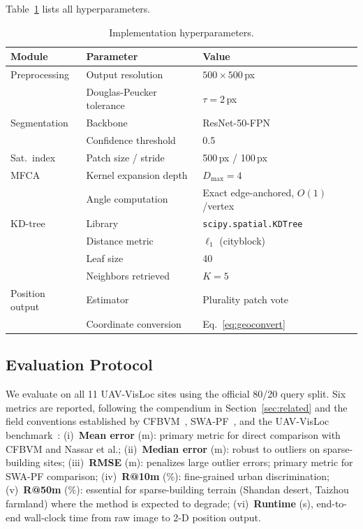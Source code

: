 \documentclass[10pt]{article}
\theoremstyle{plain}
\theoremstyle{definition}
\begin{document}
Table~\ref{tab:impl} lists all hyperparameters.

\begin{table}[htbp]
\caption{Implementation hyperparameters.}
\label{tab:impl}
\centering\small
\setlength{\tabcolsep}{4pt}
\begin{tabular}{lll}
\toprule
\textbf{Module} & \textbf{Parameter} & \textbf{Value} \\
\midrule
Preprocessing   & Output resolution            & $500\!\times\!500$\,px \\
                & Douglas-Peucker tolerance    & $\tau = 2$\,px \\
Segmentation    & Backbone                     & ResNet-50-FPN \\
                & Confidence threshold         & 0.5 \\
Sat.\ index     & Patch size / stride          & 500\,px / 100\,px \\
MFCA            & Kernel expansion depth       & $D_{\max} = 4$ \\
                & Angle computation            & Exact edge-anchored, $O(1)$/vertex \\
KD-tree         & Library                      & \texttt{scipy.spatial.KDTree} \\
                & Distance metric              & $\ell_1$ (cityblock) \\
                & Leaf size                    & 40 \\
                & Neighbors retrieved          & $K = 5$ \\
Position output & Estimator                    & Plurality patch vote \\
                & Coordinate conversion        & Eq.~\eqref{eq:geoconvert} \\
\bottomrule
\end{tabular}
\end{table}

\subsection{Evaluation Protocol}
\label{sec:protocol}

We evaluate on all 11 UAV-VisLoc sites using the official 80/20 query split.
Six metrics are reported, following the compendium in Section~\ref{sec:related}
and the field conventions established by CFBVM~\cite{ouyang2024cfbvm},
SWA-PF~\cite{yuan2025swapf}, and the UAV-VisLoc benchmark~\cite{uavvisloc2024}:
(i)~\textbf{Mean error} (m): primary metric for direct comparison with CFBVM
and Nassar et al.;
(ii)~\textbf{Median error} (m): robust to outliers on sparse-building sites;
(iii)~\textbf{RMSE} (m): penalizes large outlier errors; primary metric for
SWA-PF comparison;
(iv)~\textbf{R@10m} (\%): fine-grained urban discrimination;
(v)~\textbf{R@50m} (\%): essential for sparse-building terrain
(Shandan desert, Taizhou farmland) where the method is expected to degrade;
(vi)~\textbf{Runtime} (s), end-to-end wall-clock time from raw image to 2-D
position output.
\end{document}
